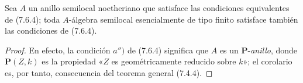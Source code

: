 \begin{corollary}[7.6.5]
\label{IV.2.s7.6.5-fr}
Sea $A$ un anillo semilocal noetheriano que satisface las condiciones
equivalentes de \textup{(7.6.4)}; toda $A$-álgebra semilocal esencialmente de tipo
finito satisface también las condiciones de \textup{(7.6.4)}.
\end{corollary}

\begin{proof}
En efecto, la condición $a'')$ de (7.6.4) significa que $A$ es un
$\boldsymbol P$-\emph{anillo}, donde $\boldsymbol P(Z,k)$ es la propiedad
«$Z$ es geométricamente reducido sobre $k$»; el corolario es, por tanto,
consecuencia del teorema general (7.4.4).
\end{proof}
